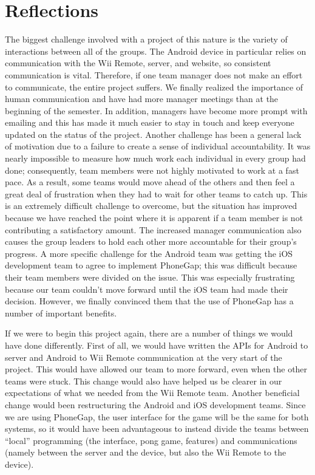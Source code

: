 \documentclass[12pt]{article}
\begin{document}
\section{Reflections}
\label{sec:reflections}
The biggest challenge involved with a project of this nature is the variety of interactions between all of the groups.  The Android device in particular relies on communication with the Wii Remote, server, and website, so consistent communication is vital.  Therefore, if one team manager does not make an effort to communicate, the entire project suffers.  We finally realized the importance of human communication and have had more manager meetings than at the beginning of the semester.  In addition, managers have become more prompt with emailing and this has made it much easier to stay in touch and keep everyone updated on the status of the project.  Another challenge has been a general lack of motivation due to a failure to create a sense of individual accountability.  It was nearly impossible to measure how much work each individual in every group had done; consequently, team members were not highly motivated to work at a fast pace.  As a result, some teams would move ahead of the others and then feel a great deal of frustration when they had to wait for other teams to catch up.  This is an extremely difficult challenge to overcome, but the situation has improved because we have reached the point where it is apparent if a team member is not contributing a satisfactory amount.  The increased manager communication also causes the group leaders to hold each other more accountable for their group’s progress.  A more specific challenge for the Android team was getting the iOS development team to agree to implement PhoneGap; this was difficult because their team members were divided on the issue.  This was especially frustrating because our team couldn’t move forward until the iOS team had made their decision.  However, we finally convinced them that the use of PhoneGap has a number of important benefits.

If we were to begin this project again, there are a number of things we would have done differently.  First of all, we would have written the APIs for Android to server and Android to Wii Remote communication at the very start of the project.  This would have allowed our team to more forward, even when the other teams were stuck.  This change would also have helped us be clearer in our expectations of what we needed from the Wii Remote team.  Another beneficial change would been restructuring the Android and iOS development teams.  Since we are using PhoneGap, the user interface for the game will be the same for both systems, so it would have been advantageous to instead divide the teams between “local” programming (the interface, pong game, features) and communications (namely between the server and the device, but also the Wii Remote to the device). 
\end{document}
